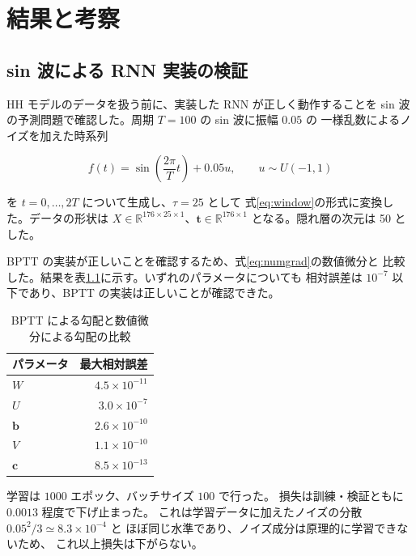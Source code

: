 \documentclass[a4paper,11pt,openany]{ltjsreport}
\begin{document}
\chapter{結果と考察}

\section{sin 波による RNN 実装の検証}
\label{sec:sin_result}

HH モデルのデータを扱う前に、実装した RNN が正しく動作することを
sin 波の予測問題で確認した。周期 $T = 100$ の sin 波に振幅 $0.05$ の
一様乱数によるノイズを加えた時系列

\begin{equation}
  f(t) = \sin\left(\frac{2\pi}{T}t\right) + 0.05u, \qquad u \sim U(-1,1)
  \label{eq:toy}
\end{equation}

を $t = 0, \dots, 2T$ について生成し、$\tau = 25$ として
式\eqref{eq:window}の形式に変換した。データの形状は
$X \in \mathbb{R}^{176 \times 25 \times 1}$、$\bm{t} \in \mathbb{R}^{176 \times 1}$
となる。隠れ層の次元は 50 とした。

BPTT の実装が正しいことを確認するため、式\eqref{eq:numgrad}の数値微分と
比較した。結果を表\ref{tab:gradcheck}に示す。いずれのパラメータについても
相対誤差は $10^{-7}$ 以下であり、BPTT の実装は正しいことが確認できた。

\begin{table}[htbp]
  \centering
  \caption{BPTT による勾配と数値微分による勾配の比較}
  \label{tab:gradcheck}
  \begin{tabular}{lr}
    \toprule
    パラメータ & 最大相対誤差 \\
    \midrule
    $W$       & $4.5 \times 10^{-11}$ \\
    $U$       & $3.0 \times 10^{-7}$ \\
    $\bm{b}$  & $2.6 \times 10^{-10}$ \\
    $V$       & $1.1 \times 10^{-10}$ \\
    $\bm{c}$  & $8.5 \times 10^{-13}$ \\
    \bottomrule
  \end{tabular}
\end{table}

学習は $1000$ エポック、バッチサイズ $100$ で行った。
損失は訓練・検証ともに $0.0013$ 程度で下げ止まった。
これは学習データに加えたノイズの分散 $0.05^2/3 \simeq 8.3\times10^{-4}$ と
ほぼ同じ水準であり、ノイズ成分は原理的に学習できないため、
これ以上損失は下がらない。
\end{document}
